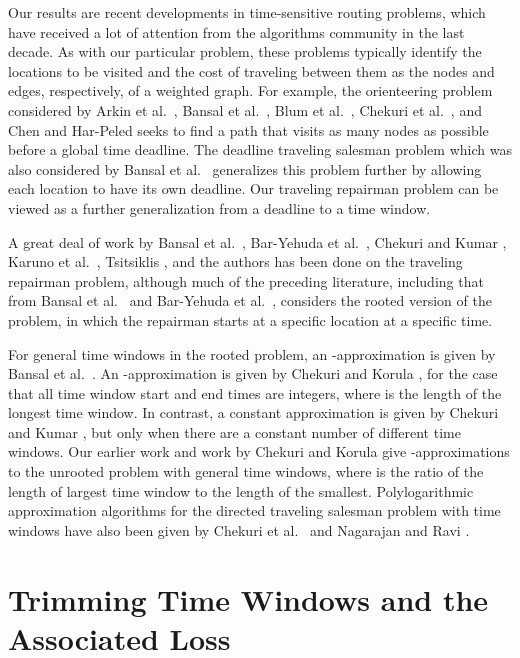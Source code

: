 \documentclass[11pt]{article}
\begin{document}
Our results are recent developments in time-sensitive routing problems, which have received a lot of attention from the algorithms community in the last decade.  As with our particular problem, these problems typically identify the locations to be visited and the cost of traveling between them as the nodes and edges, respectively, of a weighted graph.  For example, the orienteering problem considered by Arkin et al.~\cite{Arkin}, Bansal et al.~\cite{Bansal}, Blum et al.~\cite{Blum3}, Chekuri et al.~\cite{Chekuri2}, and Chen and Har-Peled \cite{Chen} seeks to find a path that visits as many nodes as possible before a global time deadline.  The deadline traveling salesman problem which was also considered by Bansal et al.~\cite{Bansal} generalizes this problem further by allowing each location to have its own deadline.  Our traveling repairman problem can be viewed as a further generalization from a deadline to a time window.  


A great deal of work by Bansal et al.~\cite{Bansal}, Bar-Yehuda et al.~\cite{Bar-Yehuda}, Chekuri and Kumar \cite{Chekuri}, Karuno et al.~\cite{Karuno3}, Tsitsiklis \cite{Tsitsiklis}, and the authors \cite{Frederickson6} has been done on the traveling repairman problem, although much of the preceding literature, including that from Bansal et al.~\cite{Bansal} and  Bar-Yehuda et al.~\cite{Bar-Yehuda}, considers the rooted version of the problem, in which the repairman starts at a specific location at a specific time. 

For general time windows in the rooted problem, an -approximation is given by Bansal et al.~\cite{Bansal}.  An -approximation is given by Chekuri and Korula \cite{Chekuri3}, for the case that all time window start and end times are integers, where  is the length of the longest time window.  In contrast, a constant approximation is given by Chekuri and Kumar \cite{Chekuri},
but only when there are a constant number of different time windows.  Our earlier work \cite{Frederickson6} and work by Chekuri and Korula \cite{Chekuri3} give -approximations to the unrooted problem with general time windows, where  is the ratio of the length of largest time window to the length of the smallest.  Polylogarithmic approximation algorithms for the directed traveling salesman problem with time windows have also been given by Chekuri et al.~\cite{Chekuri2} and Nagarajan and Ravi \cite{Nagarajan2}.

\section{Trimming Time Windows and the Associated Loss}
\label{section:trimming}
\end{document}
